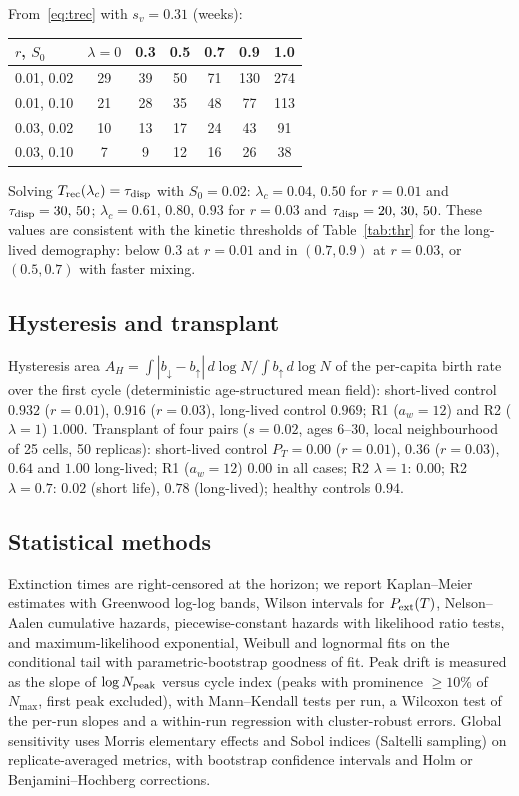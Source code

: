 From~\eqref{eq:trec} with $s_v=0.31$ (weeks):
\begin{center}\small
\begin{tabular}{lcccccc}
\toprule
$r$, $S_0$ & $\lambda=0$ & 0.3 & 0.5 & 0.7 & 0.9 & 1.0\\
\midrule
0.01, 0.02 & 29 & 39 & 50 & 71 & 130 & 274\\
0.01, 0.10 & 21 & 28 & 35 & 48 & 77 & 113\\
0.03, 0.02 & 10 & 13 & 17 & 24 & 43 & 91\\
0.03, 0.10 & 7 & 9 & 12 & 16 & 26 & 38\\
\bottomrule
\end{tabular}
\end{center}
Solving $T_{\rm rec}(\lambda_c)=\tau_{\rm disp}$ with $S_0=0.02$:
$\lambda_c=0.04,\,0.50$ for $r=0.01$ and $\tau_{\rm disp}=30,\,50$;
$\lambda_c=0.61,\,0.80,\,0.93$ for $r=0.03$ and $\tau_{\rm disp}=20,\,30,\,50$. These values are consistent with
the kinetic thresholds of Table~\ref{tab:thr} for the long-lived demography: below 0.3 at $r=0.01$ and in
$(0.7,0.9)$ at $r=0.03$, or $(0.5,0.7)$ with faster mixing.

\subsection{Hysteresis and transplant}
\label{app:hyst}

Hysteresis area $A_H=\int|b_{\downarrow}-b_{\uparrow}|\,d\log N/\int
b_{\uparrow}\,d\log N$ of the per-capita birth rate over the first cycle
(deterministic age-structured mean field): short-lived control $0.932$ ($r=0.01$),
$0.916$ ($r=0.03$), long-lived control $0.969$; R1 ($a_w=12$) and R2
($\lambda=1$) $1.000$. Transplant of four pairs ($s=0.02$, ages 6--30, local
neighbourhood of 25 cells, 50 replicas): short-lived control $P_T=0.00$ ($r=0.01$),
$0.36$ ($r=0.03$), $0.64$ and $1.00$ long-lived; R1 ($a_w=12$) $0.00$ in all
cases; R2 $\lambda=1$: $0.00$; R2 $\lambda=0.7$: $0.02$ (short life),
$0.78$ (long-lived); healthy controls $0.94$.

\subsection{Statistical methods}
\label{app:stats}

Extinction times are right-censored at the horizon; we report Kaplan--Meier
estimates with Greenwood log-log bands, Wilson intervals for $P_{\rm ext}(T)$,
Nelson--Aalen cumulative hazards, piecewise-constant hazards with likelihood
ratio tests, and maximum-likelihood exponential, Weibull and lognormal fits on
the conditional tail with parametric-bootstrap goodness of fit. Peak drift is
measured as the slope of $\log N_{\rm peak}$ versus cycle index (peaks with
prominence $\ge10\%$ of $N_{\max}$, first peak excluded), with Mann--Kendall
tests per run, a Wilcoxon test of the per-run slopes and a within-run
regression with cluster-robust errors. Global sensitivity uses Morris
elementary effects and Sobol indices (Saltelli sampling) on replicate-averaged
metrics, with bootstrap confidence intervals and Holm or Benjamini--Hochberg
corrections.

